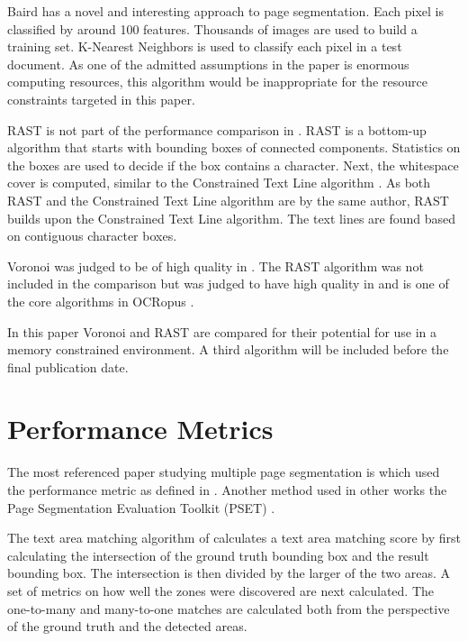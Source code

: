 \documentclass[conference]{IEEEtran}
\begin{document}
Baird \cite{baird2006versatile} has a novel and interesting approach to page
segmentation. Each pixel is classified by around 100 features. Thousands of
images are used to build a training set. K-Nearest Neighbors is used
to classify each pixel in a test document. As one of the admitted assumptions
in the paper is enormous computing resources, this algorithm would be
inappropriate for the resource constraints targeted in this paper.

RAST is not part of the performance comparison in \cite{shafait2006performance,mao2000empirical}. 
RAST is a bottom-up algorithm that starts with bounding boxes of connected
components. Statistics on the boxes are used to decide if the box contains a
character. Next, the whitespace cover is computed, similar to the Constrained
Text Line algorithm \cite{breuel2002two}.  As both RAST and the Constrained
Text Line algorithm are by the same author, RAST builds upon the Constrained
Text Line algorithm. The text lines are found based on contiguous character
boxes.

Voronoi was judged to be of high quality in \cite{shafait2006performance}. The
RAST algorithm was not included in the \cite{shafait2006performance} comparison
but was judged to have high quality in \cite{winder2010extending} and is one of
the core algorithms in OCRopus \cite{breuel2008ocropus}. 

In this paper Voronoi and RAST are compared for their potential for use in a
memory constrained environment. A third algorithm will be included before the
final publication date.


\section{Performance Metrics}
The most referenced paper studying multiple page segmentation is
\cite{shafait2006performance} which used the performance metric as defined in
\cite{phillips1999empirical}. Another method used in other works the Page Segmentation
Evaluation Toolkit (PSET) \cite{mao2000pset,mao2002software}.

The text area matching algorithm of \cite{phillips1999empirical} calculates a
text area matching score by first calculating the intersection of the ground
truth bounding box and the result bounding box. The intersection is
then divided by the larger of the two areas. A set of metrics on how well the
zones were discovered are next calculated.  The one-to-many and many-to-one
matches are calculated both from the perspective of the ground truth and the
detected areas. 
\end{document}
